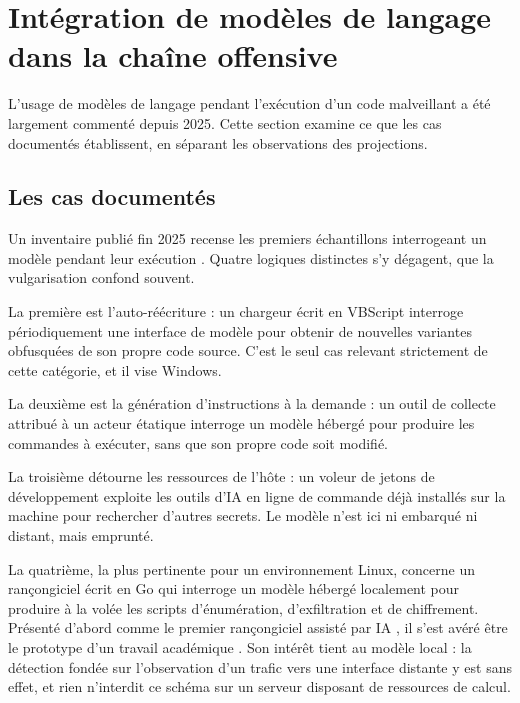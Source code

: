 \section{Intégration de modèles de langage dans la chaîne offensive}
\label{sec:llm}

L'usage de modèles de langage pendant l'exécution d'un code malveillant a été largement commenté depuis 2025. Cette section examine ce que les cas documentés établissent, en séparant les observations des projections.

\subsection{Les cas documentés}

Un inventaire publié fin 2025 recense les premiers échantillons interrogeant un modèle pendant leur exécution \cite{gtigAI}. Quatre logiques distinctes s'y dégagent, que la vulgarisation confond souvent.

La première est l'auto-réécriture : un chargeur écrit en VBScript interroge périodiquement une interface de modèle pour obtenir de nouvelles variantes obfusquées de son propre code source. C'est le seul cas relevant strictement de cette catégorie, et il vise Windows.

La deuxième est la génération d'instructions à la demande : un outil de collecte attribué à un acteur étatique interroge un modèle hébergé pour produire les commandes à exécuter, sans que son propre code soit modifié.

La troisième détourne les ressources de l'hôte : un voleur de jetons de développement exploite les outils d'IA en ligne de commande déjà installés sur la machine pour rechercher d'autres secrets. Le modèle n'est ici ni embarqué ni distant, mais emprunté.

La quatrième, la plus pertinente pour un environnement Linux, concerne un rançongiciel écrit en Go qui interroge un modèle hébergé localement pour produire à la volée les scripts d'énumération, d'exfiltration et de chiffrement. Présenté d'abord comme le premier rançongiciel assisté par IA \cite{esetPromptLock}, il s'est avéré être le prototype d'un travail académique \cite{nyuRansomware}. Son intérêt tient au modèle local : la détection fondée sur l'observation d'un trafic vers une interface distante y est sans effet, et rien n'interdit ce schéma sur un serveur disposant de ressources de calcul.

